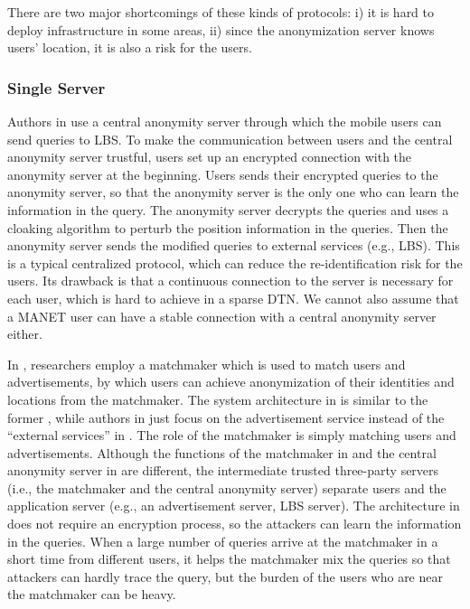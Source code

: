 There are two major shortcomings of these kinds of protocols: i) it is hard to deploy infrastructure in some areas, ii) since the anonymization server knows users' location, it is also a risk for the users.


\subsubsection{ Single Server}

\noindent Authors in \cite {C15} use a central anonymity server through which the mobile users can send queries to LBS. To make the communication between users and the central anonymity server trustful, users set up an encrypted connection with the anonymity server at the beginning. Users sends their encrypted queries to the anonymity server, so that the anonymity server is the only one who can learn the information in the query. The anonymity server decrypts the queries and uses a cloaking algorithm to perturb the position information in the queries. Then the anonymity server sends the modified queries to external services (e.g., LBS). This is a typical centralized protocol, which can reduce the re-identification risk for the users. Its drawback is that a continuous connection to the server is necessary for each user, which is hard to achieve in a sparse DTN. We cannot also assume that a MANET user can have a stable connection with a central anonymity server either.

In \cite {C23}, researchers employ a matchmaker which is used to match users and advertisements, by which users can achieve anonymization of their identities and locations from the matchmaker. The system architecture in \cite {C23} is similar to the former \cite {C15}, while authors in \cite {C23} just focus on the advertisement service instead of the ``external services'' in \cite{C15}. The role of the matchmaker is simply matching users and advertisements. Although the functions of the matchmaker in \cite {C23} and the central anonymity server in \cite {C15} are different, the intermediate trusted three-party servers (i.e., the matchmaker and the central anonymity server) separate users and the application server (e.g., an advertisement server, LBS server). The architecture in \cite {C23} does not require an encryption process, so the attackers can learn the information in the queries. When a large number of queries arrive at the matchmaker in a short time from different users, it helps the matchmaker mix the queries so that attackers can hardly trace the query, but the burden of the users who are near the matchmaker can be heavy.

